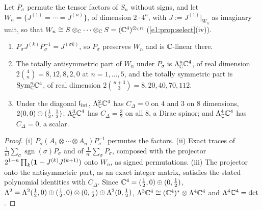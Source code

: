 \begin{proposition}
\label{e3:prop:ungraded}
Let $P_\sigma$ permute the tensor factors of $S_n$ without signs, and let $W_n=\{J^{(1)}=\cdots=J^{(n)}\}$, of dimension $2\cdot4^n$, with $J:=J^{(1)}|_{W_n}$ as
imaginary unit, so that $W_n\cong S\otimes_{\mathbb{C}}\cdots\otimes_{\mathbb{C}} S=(\mathbb{C}^4)^{\otimes_{\mathbb{C}} n}$ (\cref{e1:prop:select}(iv)).
\begin{enumerate}[label=(\roman*),leftmargin=2.2em]
\item $P_\sigma J^{(k)}P_\sigma^{-1}=J^{(\sigma k)}$, so $P_\sigma$ preserves $W_n$ and is $\mathbb{C}$-linear there.
\item The totally antisymmetric part of $W_n$ under $P_\sigma$ is $\Lambda^n_{\mathbb{C}}\mathbb{C}^4$, of real dimension $2\binom4n=8,12,8,2,0$ at $n=1,\dots,5$, and the
totally symmetric part is $\mathrm{Sym}^n_{\mathbb{C}}\mathbb{C}^4$, of real dimension $2\binom{n+3}3=8,20,40,70,112$.
\item Under the diagonal $\mathfrak l_{\rm int}$, $\Lambda^2_{\mathbb{C}}\mathbb{C}^4$ has $C_\Delta=0$ on $4$ and $3$ on $8$ dimensions, $2(0,0)\oplus(\tfrac12,\tfrac12)$; $\Lambda^3_{\mathbb{C}}\mathbb{C}^4$ has
$C_\Delta=\tfrac32$ on all $8$, a Dirac spinor; and $\Lambda^4_{\mathbb{C}}\mathbb{C}^4$ has $C_\Delta=0$, a scalar.
\end{enumerate}
\end{proposition}

\begin{proof}
(i) $P_\sigma(A_1\otimes\cdots\otimes A_n)P_\sigma^{-1}$ permutes the factors. (ii) Exact traces of $\frac1{n!}\sum_\sigma\operatorname{sgn}(\sigma)P_\sigma$ and of $\frac1{n!}\sum_\sigma P_\sigma$, composed with the projector
$2^{1-n}\prod_k(\mathbf 1-J^{(k)}J^{(k+1)})$ onto $W_n$, as signed permutations. (iii) The projector onto the antisymmetric part, as an exact integer matrix,
satisfies the stated polynomial identities with $C_\Delta$. Since $\mathbb{C}^4=(\tfrac12,0)\oplus(0,\tfrac12)$,
$\Lambda^2=\Lambda^2(\tfrac12,0)\oplus(\tfrac12,0)\otimes(0,\tfrac12)\oplus\Lambda^2(0,\tfrac12)$, $\Lambda^3\mathbb{C}^4\cong(\mathbb{C}^4)^*\otimes\Lambda^4\mathbb{C}^4$ and $\Lambda^4\mathbb{C}^4=\det$.
\end{proof}

